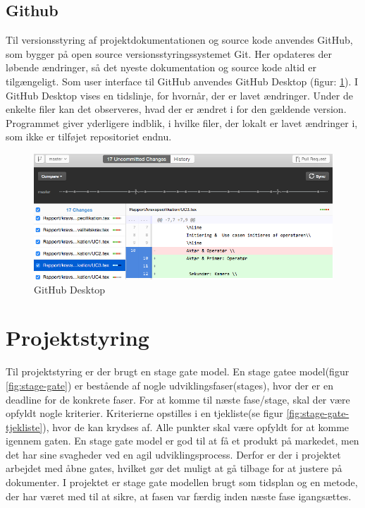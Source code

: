 \subsection{Github}
\label{subsec:github}
Til versionsstyring af projektdokumentationen og source kode anvendes GitHub, som bygger på open source versionsstyringssystemet Git. Her opdateres der løbende ændringer, så det nyeste dokumentation og source kode altid er tilgængeligt. 
Som user interface til GitHub anvendes GitHub Desktop (figur: \ref{fig:git}). I GitHub Desktop vises en tidslinje, for hvornår, der er lavet ændringer. Under de enkelte filer kan det observeres, hvad der er ændret i for den gældende version. Programmet giver yderligere indblik, i hvilke filer, der lokalt er lavet ændringer i, som ikke er tilføjet repositoriet endnu.
\begin{figure}[H]
	\centering
	\includegraphics[width=1\textwidth]{billeder/github.png}
	\caption{GitHub Desktop}
	\label{fig:git}
\end{figure}
\newpage

\section{Projektstyring} 
Til projektstyring er der brugt en stage gate model. En stage gatee model(figur \ref{fig:stage-gate}) er bestående af nogle udviklingsfaser(stages), hvor der er en deadline for de konkrete faser. For at komme til næste fase/stage, skal der være opfyldt nogle kriterier. Kriterierne opstilles i en tjekliste(se figur \ref{fig:stage-gate-tjekliste}), hvor de kan krydses af. Alle punkter skal være opfyldt for at komme igennem gaten. En stage gate model er god til at få et produkt på markedet, men det har sine svagheder ved en agil udviklingsprocess. Derfor er der i projektet arbejdet med åbne gates, hvilket gør det muligt at gå tilbage for at justere på dokumenter. I projektet er stage gate modellen brugt som tidsplan og en metode, der har været med til at sikre, at fasen var færdig inden næste fase igangsættes. 

